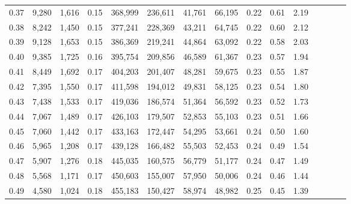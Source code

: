 \begin{tabular}{rrrcrrrrrrrrrrr}
0.37 &   9,280 &  1,616 &                                       0.15 &  368,999 &  236,611 &   41,761 &   66,195 &  0.22 &  0.61 &                         2.19 \\
0.38 &   8,242 &  1,450 &                                       0.15 &  377,241 &  228,369 &   43,211 &   64,745 &  0.22 &  0.60 &                         2.12 \\
0.39 &   9,128 &  1,653 &                                       0.15 &  386,369 &  219,241 &   44,864 &   63,092 &  0.22 &  0.58 &                         2.03 \\
0.40 &   9,385 &  1,725 &                                       0.16 &  395,754 &  209,856 &   46,589 &   61,367 &  0.23 &  0.57 &                         1.94 \\
0.41 &   8,449 &  1,692 &                                       0.17 &  404,203 &  201,407 &   48,281 &   59,675 &  0.23 &  0.55 &                         1.87 \\
0.42 &   7,395 &  1,550 &                                       0.17 &  411,598 &  194,012 &   49,831 &   58,125 &  0.23 &  0.54 &                         1.80 \\
0.43 &   7,438 &  1,533 &                                       0.17 &  419,036 &  186,574 &   51,364 &   56,592 &  0.23 &  0.52 &                         1.73 \\
0.44 &   7,067 &  1,489 &                                       0.17 &  426,103 &  179,507 &   52,853 &   55,103 &  0.23 &  0.51 &                         1.66 \\
0.45 &   7,060 &  1,442 &                                       0.17 &  433,163 &  172,447 &   54,295 &   53,661 &  0.24 &  0.50 &                         1.60 \\
0.46 &   5,965 &  1,208 &                                       0.17 &  439,128 &  166,482 &   55,503 &   52,453 &  0.24 &  0.49 &                         1.54 \\
0.47 &   5,907 &  1,276 &                                       0.18 &  445,035 &  160,575 &   56,779 &   51,177 &  0.24 &  0.47 &                         1.49 \\
0.48 &   5,568 &  1,171 &                                       0.17 &  450,603 &  155,007 &   57,950 &   50,006 &  0.24 &  0.46 &                         1.44 \\
0.49 &   4,580 &  1,024 &                                       0.18 &  455,183 &  150,427 &   58,974 &   48,982 &  0.25 &  0.45 &                         1.39 \\

\end{tabular}
